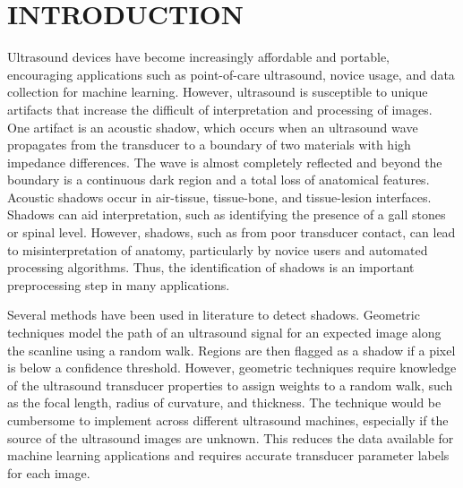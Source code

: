 \documentclass[preprint,5p]{elsarticle}
\begin{document}




\section*{INTRODUCTION}
\label{intro}
Ultrasound devices have become increasingly affordable and portable, encouraging applications such as point-of-care ultrasound, novice usage, and data collection for machine learning. However, ultrasound is susceptible to unique artifacts that increase the difficult of interpretation and processing of images. One artifact is an acoustic shadow, which occurs when an ultrasound wave propagates from the transducer to a boundary of two materials with high impedance differences. The wave is almost completely reflected and beyond the boundary is a continuous dark region and a total loss of anatomical features. Acoustic shadows occur in air-tissue, tissue-bone, and tissue-lesion interfaces. Shadows can aid interpretation, such as identifying the presence of a gall stones or spinal level. However, shadows, such as from poor transducer contact, can lead to misinterpretation of anatomy, particularly by novice users and automated processing algorithms. Thus, the identification of shadows is an important preprocessing step in many applications.

Several methods have been used in literature to detect shadows. Geometric techniques model the path of an ultrasound signal for an expected image along the scanline using a random walk. Regions are then flagged as a shadow if a pixel is below a confidence threshold. However, geometric techniques require knowledge of the ultrasound transducer properties to assign weights to a random walk, such as the focal length, radius of curvature, and thickness. The technique would be cumbersome to implement across different ultrasound machines, especially if the source of the ultrasound images are unknown. This reduces the data available for machine learning applications and requires accurate transducer parameter labels for each image.
\end{document}
